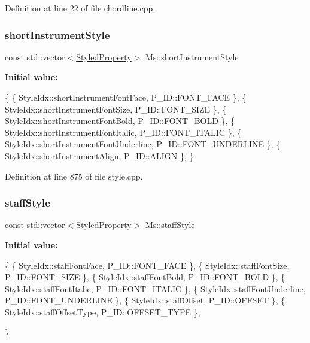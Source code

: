 Definition at line 22 of file chordline.\+cpp.

\mbox{\label{namespace_ms_ac7ae96d31f43fe0dabfdc1003719d0e0}} 
\subsubsection{\texorpdfstring{short\+Instrument\+Style}{shortInstrumentStyle}}
{\footnotesize\ttfamily const std\+::vector$<$\hyperlink{struct_ms_1_1_styled_property}{Styled\+Property}$>$ Ms\+::short\+Instrument\+Style}

{\bfseries Initial value\+:}
\begin{DoxyCode}
\{
      \{ StyleIdx::shortInstrumentFontFace,            P\_ID::FONT\_FACE              \},
      \{ StyleIdx::shortInstrumentFontSize,            P\_ID::FONT\_SIZE              \},
      \{ StyleIdx::shortInstrumentFontBold,            P\_ID::FONT\_BOLD              \},
      \{ StyleIdx::shortInstrumentFontItalic,          P\_ID::FONT\_ITALIC            \},
      \{ StyleIdx::shortInstrumentFontUnderline,       P\_ID::FONT\_UNDERLINE         \},
      \{ StyleIdx::shortInstrumentAlign,               P\_ID::ALIGN                  \},
      \}
\end{DoxyCode}


Definition at line 875 of file style.\+cpp.

\mbox{\label{namespace_ms_a09fe3a448d38cd1e3911560f042e0eb0}} 
\subsubsection{\texorpdfstring{staff\+Style}{staffStyle}}
{\footnotesize\ttfamily const std\+::vector$<$\hyperlink{struct_ms_1_1_styled_property}{Styled\+Property}$>$ Ms\+::staff\+Style}

{\bfseries Initial value\+:}
\begin{DoxyCode}
\{
      \{ StyleIdx::staffFontFace,                      P\_ID::FONT\_FACE              \},
      \{ StyleIdx::staffFontSize,                      P\_ID::FONT\_SIZE              \},
      \{ StyleIdx::staffFontBold,                      P\_ID::FONT\_BOLD              \},
      \{ StyleIdx::staffFontItalic,                    P\_ID::FONT\_ITALIC            \},
      \{ StyleIdx::staffFontUnderline,                 P\_ID::FONT\_UNDERLINE         \},
      \{ StyleIdx::staffOffset,                        P\_ID::OFFSET                 \},
      \{ StyleIdx::staffOffsetType,                    P\_ID::OFFSET\_TYPE            \},

      \}
\end{DoxyCode}


